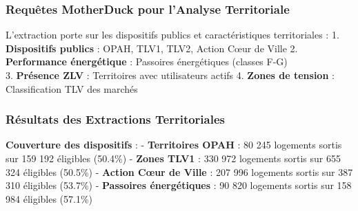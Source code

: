 \documentclass[11pt]{article}
\begin{document}
\subsubsection{Requêtes MotherDuck pour l'Analyse
Territoriale}\label{requuxeates-motherduck-pour-lanalyse-territoriale}

L'extraction porte sur les dispositifs publics et caractéristiques
territoriales : 1. \textbf{Dispositifs publics} : OPAH, TLV1, TLV2,
Action Cœur de Ville 2. \textbf{Performance énergétique} : Passoires
énergétiques (classes F-G)\\
3. \textbf{Présence ZLV} : Territoires avec utilisateurs actifs 4.
\textbf{Zones de tension} : Classification TLV des marchés

\subsubsection{Résultats des Extractions
Territoriales}\label{ruxe9sultats-des-extractions-territoriales}

\textbf{Couverture des dispositifs} : - \textbf{Territoires OPAH} : 80
245 logements sortis sur 159 192 éligibles (50.4\%) - \textbf{Zones
TLV1} : 330 972 logements sortis sur 655 324 éligibles (50.5\%) -
\textbf{Action Cœur de Ville} : 207 996 logements sortis sur 387 310
éligibles (53.7\%) - \textbf{Passoires énergétiques} : 90 820 logements
sortis sur 158 984 éligibles (57.1\%)
\end{document}
